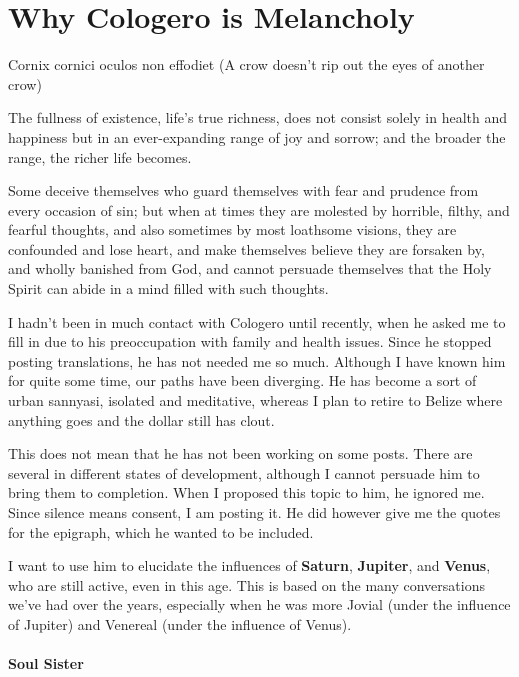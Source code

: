 \section{Why Cologero is Melancholy}

\begin{quotex}
Cornix cornici oculos non effodiet (A crow doesn't rip out the eyes of another crow)

The fullness of existence, life's true richness, does not consist solely in health and happiness but in an ever-expanding range of joy and sorrow; and the broader the range, the richer life becomes.

Some deceive themselves who guard themselves with fear and prudence from every occasion of sin; but when at times they are molested by horrible, filthy, and fearful thoughts, and also sometimes by most loathsome visions, they are confounded and lose heart, and make themselves believe they are forsaken by, and wholly banished from God, and cannot persuade themselves that the Holy Spirit can abide in a mind filled with such thoughts.
\end{quotex}


I hadn't been in much contact with Cologero until recently, when he asked me to fill in due to his preoccupation with family and health issues. Since he stopped posting translations, he has not needed me so much. Although I have known him for quite some time, our paths have been diverging. He has become a sort of urban sannyasi, isolated and meditative, whereas I plan to retire to Belize where anything goes and the dollar still has clout.

This does not mean that he has not been working on some posts. There are several in different states of development, although I cannot persuade him to bring them to completion. When I proposed this topic to him, he ignored me. Since silence means consent, I am posting it. He did however give me the quotes for the epigraph, which he wanted to be included.

I want to use him to elucidate the influences of \textbf{Saturn}, \textbf{Jupiter}, and \textbf{Venus}, who are still active, even in this age. This is based on the many conversations we've had over the years, especially when he was more Jovial (under the influence of Jupiter) and Venereal (under the influence of Venus).

\paragraph{Soul Sister}

